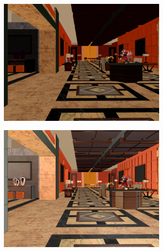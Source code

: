 \begin{figure}[H]
\begin{subfigure}{0.32\linewidth}
        \includegraphics[width=\linewidth]{praca/images/AI44_010_Cam01.direct_sengputa.png}
    \end{subfigure}
    \begin{subfigure}{0.32\linewidth}
        \includegraphics[width=\linewidth]{praca/images/AI44_010_Cam01.direct_ours.png}
    \end{subfigure}
    \begin{subfigure}{0.32\linewidth}

\end{subfigure}
\end{figure}
